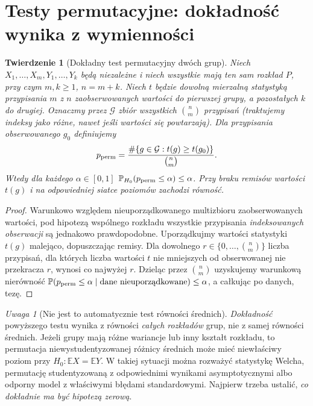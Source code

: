 \documentclass[11pt,a4paper,oneside]{report}
\numberwithin{equation}{chapter}
\theoremstyle{plain}
\newtheorem{twierdzenie}{Twierdzenie}[chapter]
\theoremstyle{definition}
\theoremstyle{remark}
\newtheorem{uwaga}{Uwaga}[chapter]
\newcommand{\Prob}{\mathbb P}
\newcommand{\E}{\mathbb E}
\begin{document}
\section{Testy permutacyjne: dokładność wynika z wymienności}
\begin{twierdzenie}[Dokładny test permutacyjny dwóch grup]
\label{thm:permutation-exact}
Niech $X_1,\ldots,X_m,Y_1,\ldots,Y_k$ będą niezależne
i niech wszystkie mają \emph{ten sam} rozkład $P$,
przy czym $m,k\ge1$, $n=m+k$.
Niech $t$ będzie dowolną mierzalną statystyką przypisania
$m$ z $n$ zaobserwowanych wartości do pierwszej grupy,
a pozostałych $k$ do drugiej. Oznaczmy przez $\mathcal G$
zbiór wszystkich $\binom nm$ przypisań (traktujemy indeksy
jako różne, nawet jeśli wartości się powtarzają).
Dla przypisania obserwowanego $g_0$ definiujemy
\[
 p_{\rm perm}=
 \frac{\#\{g\in\mathcal G:t(g)\ge t(g_0)\}}{\binom nm}.
\]
Wtedy dla każdego $\alpha\in[0,1]$
$\Prob_{H_0}(p_{\rm perm}\le\alpha)\le\alpha$.
Przy braku remisów wartości $t(g)$ i na odpowiedniej
siatce poziomów zachodzi równość.
\end{twierdzenie}
\begin{proof}
Warunkowo względem nieuporządkowanego multizbioru
zaobserwowanych wartości, pod hipotezą wspólnego rozkładu
wszystkie przypisania \emph{indeksowanych obserwacji}
są jednakowo prawdopodobne. Uporządkujmy wartości statystyki
$t(g)$ malejąco, dopuszczając remisy. Dla dowolnego
$r\in\{0,\ldots,\binom nm\}$ liczba przypisań,
dla których liczba wartości $t$ nie mniejszych od obserwowanej
nie przekracza $r$, wynosi co najwyżej $r$.
Dzieląc przez $\binom nm$ uzyskujemy warunkową nierówność
$\Prob(p_{\rm perm}\le\alpha\mid\text{dane nieuporządkowane})
\le\alpha$, a całkując po danych, tezę.
\end{proof}

\begin{uwaga}[Nie jest to automatycznie test równości średnich]
\label{rem:perm-exchangeability}
\emph{Dokładność} powyższego testu wynika z równości
\emph{całych rozkładów} grup, nie z samej równości średnich.
Jeżeli grupy mają różne wariancje lub inny kształt rozkładu,
to permutacja niewystudentyzowanej różnicy średnich może
mieć niewłaściwy poziom przy $H_0:\E X=\E Y$.
W takiej sytuacji można rozważyć statystykę Welcha,
permutację studentyzowaną z odpowiednimi wynikami
asymptotycznymi albo odporny model z właściwymi
błędami standardowymi. Najpierw trzeba ustalić,
\emph{co dokładnie ma być hipotezą zerową}.
\end{uwaga}
\end{document}
